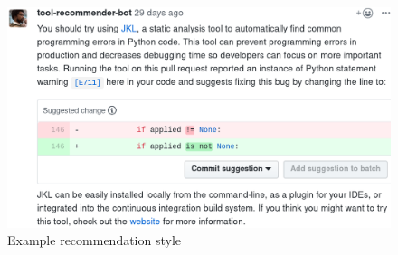 \begin{figure}[H]
\centering
	\includegraphics[width=\textwidth]{Chapter-5/images/sugg-recommendation.png}
	\caption{Example \suggs recommendation style}	
	\label{fig:sugg-rec} 
\end{figure}